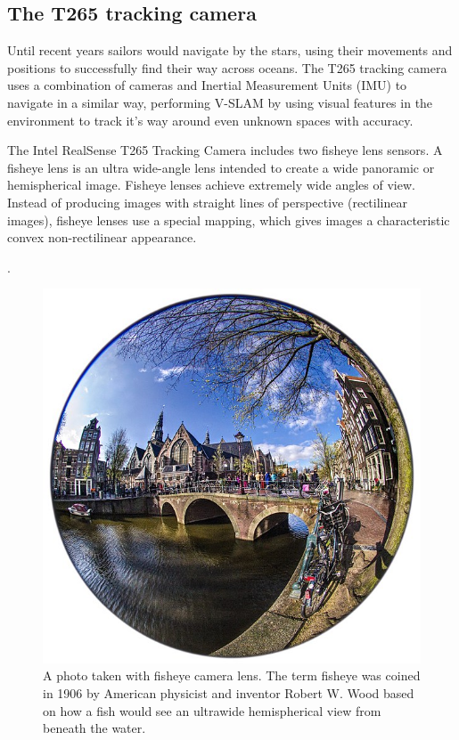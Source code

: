 \documentclass{article}
\begin{document}
\subsection{The T265 tracking camera}

Until recent years sailors would navigate by the stars, using their movements and positions to successfully find their way across oceans. The T265 tracking camera uses a combination of cameras and Inertial Measurement Units (IMU) to navigate in a similar way, performing V-SLAM by using visual features in the environment to track it’s way around even unknown spaces with accuracy. 

The Intel RealSense T265 Tracking Camera includes two fisheye lens sensors. A fisheye lens is an ultra wide-angle lens intended to create a wide panoramic or hemispherical image. Fisheye lenses achieve extremely wide angles of view. Instead of producing images with straight lines of perspective (rectilinear images), fisheye lenses use a special mapping, which gives images a characteristic convex non-rectilinear appearance. 

.

\begin{figure}[h] %
	\centering
	\includegraphics[width=1\columnwidth]{report1-img003.png} %
	\caption{A photo taken with fisheye camera lens. The term fisheye was coined in 1906 by American physicist and inventor Robert W. Wood based on how a fish would see an ultrawide hemispherical view from beneath the water.}
\end{figure}
\end{document}
